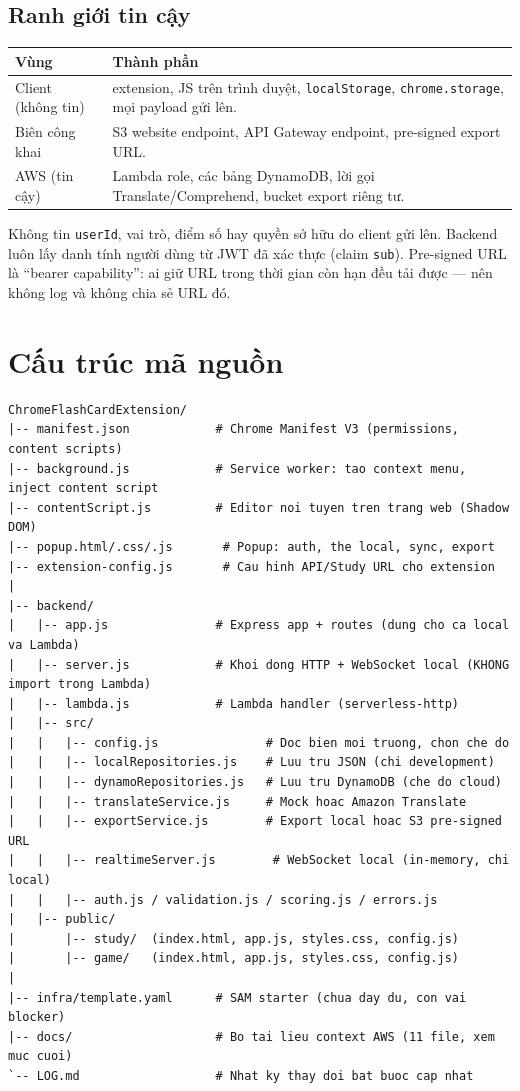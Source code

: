 \documentclass[11pt,a4paper]{article}
\newcommand{\code}[1]{\texttt{#1}}
\begin{document}
\subsection{Ranh giới tin cậy}
\begin{longtable}{@{}p{4.2cm} p{11cm}@{}}
\toprule
\textbf{Vùng} & \textbf{Thành phần} \\
\midrule
\endhead
Client (không tin) & extension, JS trên trình duyệt, \code{localStorage}, \code{chrome.storage}, mọi payload gửi lên. \\
Biên công khai & S3 website endpoint, API Gateway endpoint, pre-signed export URL. \\
AWS (tin cậy) & Lambda role, các bảng DynamoDB, lời gọi Translate/Comprehend, bucket export riêng tư. \\
\bottomrule
\end{longtable}

\begin{note}
Không tin \code{userId}, vai trò, điểm số hay quyền sở hữu do client gửi lên. Backend luôn lấy
danh tính người dùng từ JWT đã xác thực (claim \code{sub}). Pre-signed URL là ``bearer capability'':
ai giữ URL trong thời gian còn hạn đều tải được — nên không log và không chia sẻ URL đó.
\end{note}

\section{Cấu trúc mã nguồn}

\begin{lstlisting}
ChromeFlashCardExtension/
|-- manifest.json            # Chrome Manifest V3 (permissions, content scripts)
|-- background.js            # Service worker: tao context menu, inject content script
|-- contentScript.js         # Editor noi tuyen tren trang web (Shadow DOM)
|-- popup.html/.css/.js       # Popup: auth, the local, sync, export
|-- extension-config.js       # Cau hinh API/Study URL cho extension
|
|-- backend/
|   |-- app.js               # Express app + routes (dung cho ca local va Lambda)
|   |-- server.js            # Khoi dong HTTP + WebSocket local (KHONG import trong Lambda)
|   |-- lambda.js            # Lambda handler (serverless-http)
|   |-- src/
|   |   |-- config.js               # Doc bien moi truong, chon che do
|   |   |-- localRepositories.js    # Luu tru JSON (chi development)
|   |   |-- dynamoRepositories.js   # Luu tru DynamoDB (che do cloud)
|   |   |-- translateService.js     # Mock hoac Amazon Translate
|   |   |-- exportService.js        # Export local hoac S3 pre-signed URL
|   |   |-- realtimeServer.js        # WebSocket local (in-memory, chi local)
|   |   |-- auth.js / validation.js / scoring.js / errors.js
|   |-- public/
|       |-- study/  (index.html, app.js, styles.css, config.js)
|       |-- game/   (index.html, app.js, styles.css, config.js)
|
|-- infra/template.yaml      # SAM starter (chua day du, con vai blocker)
|-- docs/                    # Bo tai lieu context AWS (11 file, xem muc cuoi)
`-- LOG.md                   # Nhat ky thay doi bat buoc cap nhat
\end{lstlisting}
\end{document}
